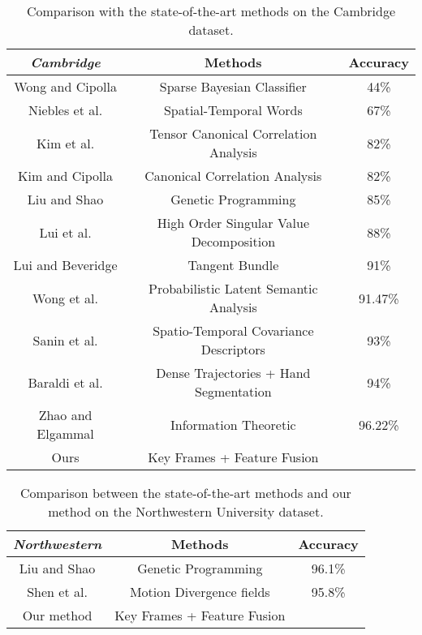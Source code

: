\documentclass[5p]{elsarticle}
\begin{document}
\begin{table*}[!tbp]
	\caption{Comparison with the state-of-the-art methods on the Cambridge dataset.}
	\centering
\begin{tabular}{c|c|c}
		\hline
		\emph{Cambridge}                             & Methods                                 & Accuracy \\ \hline 
		Wong and Cipolla \cite{wong2005real}         & Sparse Bayesian Classifier              & 44\%  \\ 
		Niebles et al. \cite{niebles2008unsupervised}& Spatial-Temporal Words                  & 67\% \\
		Kim et al. \cite{kim2007tensor}              & Tensor Canonical Correlation Analysis   & 82\% \\
		Kim and Cipolla \cite{kim2009canonical}      & Canonical Correlation Analysis          & 82\% \\
		Liu and Shao \cite{liu2013synthesis}         & Genetic Programming                     & 85\% \\
		Lui et al. \cite{lui2010action}              & High Order Singular Value Decomposition & 88\% \\
		Lui and Beveridge \cite{lui2011tangent}      & Tangent Bundle                          & 91\% \\
		Wong et al. \cite{wong2007learning}          & Probabilistic Latent Semantic Analysis  & 91.47\% \\
		Sanin et al. \cite{sanin2013spatio}          & Spatio-Temporal Covariance Descriptors  & 93\% \\
		Baraldi et al. \cite{baraldi2014gesture}     & Dense Trajectories + Hand Segmentation  & 94\% \\
		Zhao and Elgammal \cite{zhao2008information} & Information Theoretic                   & 96.22\% \\ \hline
		Ours                                   & Key Frames + Feature Fusion &\bm{} \\ \hline
	\end{tabular}
	\label{Tab:cambridge}
\end{table*}

\begin{table*}[!tbp]
	\caption{Comparison between the state-of-the-art methods and our method on the Northwestern University dataset.}
	\centering
\begin{tabular}{c|c|c}
		\hline
		\emph{Northwestern}                  & Methods                     & Accuracy \\ \hline 
		Liu and Shao \cite{liu2013synthesis} & Genetic Programming         & 96.1\%  \\
		Shen et al. \cite{shen2012dynamic}   & Motion Divergence fields    & 95.8\%  \\ \hline
		Our method                           & Key Frames + Feature Fusion & \bm{}  \\ \hline
	\end{tabular}
	\label{Tab:northwestern}
\end{table*}
\end{document}
